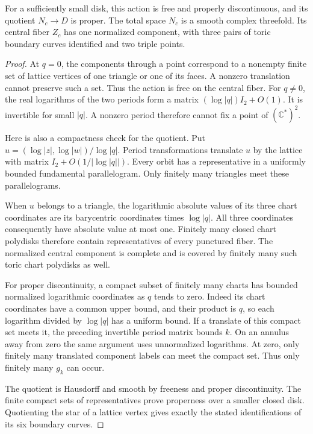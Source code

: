 \begin{proposition}\label{c26:prop:quotient}
For a sufficiently small disk, this action is free and properly
discontinuous, and its quotient $N_c\to D$ is proper.
The total space $N_c$ is a smooth complex threefold.
Its central fiber $Z_c$ has one normalized component, with three pairs
of toric boundary curves identified and two triple points.
\end{proposition}

\begin{proof}
At $q=0$, the components through a point correspond to a nonempty finite
set of lattice vertices of one triangle or one of its faces.
A nonzero translation cannot preserve such a set.
Thus the action is free on the central fiber.
For $q\ne0$, the real logarithms of the two periods form a matrix
$(\log|q|)I_2+O(1)$. It is invertible for small $|q|$.
A nonzero period therefore cannot fix a point of $(\mathbb C^*)^2$.

Here is also a compactness check for the quotient.
Put $u=(\log|z|,\log|w|)/\log|q|$.
Period transformations translate $u$ by the lattice with matrix
$I_2+O(1/|\log|q||)$.
Every orbit has a representative in a uniformly bounded fundamental
parallelogram. Only finitely many triangles meet these parallelograms.

When $u$ belongs to a triangle, the logarithmic absolute values of its
three chart coordinates are its barycentric coordinates times $\log|q|$.
All three coordinates consequently have absolute value at most one.
Finitely many closed chart polydisks therefore contain representatives
of every punctured fiber. The normalized central component is complete
and is covered by finitely many such toric chart polydisks as well.

For proper discontinuity, a compact subset of finitely many charts has
bounded normalized logarithmic coordinates as $q$ tends to zero.
Indeed its chart coordinates have a common upper bound, and their
product is $q$, so each logarithm divided by $\log|q|$ has a uniform bound.
If a translate of this compact set meets it, the preceding invertible
period matrix bounds $k$. On an annulus away from zero the same argument
uses unnormalized logarithms. At zero, only finitely many translated
component labels can meet the compact set.
Thus only finitely many $g_k$ can occur.

The quotient is Hausdorff and smooth by freeness and proper discontinuity.
The finite compact sets of representatives prove properness over a
smaller closed disk. Quotienting the star of a lattice vertex gives
exactly the stated identifications of its six boundary curves.
\end{proof}

